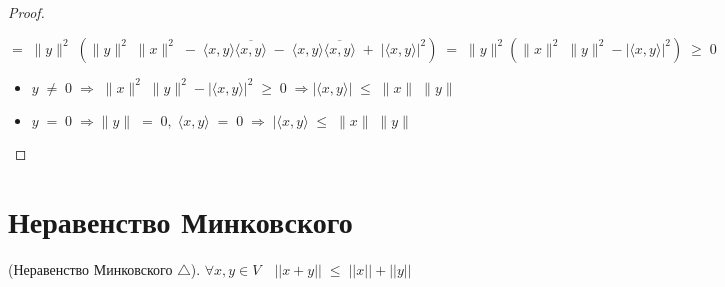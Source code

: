 \documentclass[12px]{report}
\begin{document}
\begin{proof}
\begin{enumerate}
        $$= \; \|y\|^2 \; (\|y\|^2 \; \|x\|^2 \; - \; \langle x, y \rangle \overline{\langle x, y \rangle} \; - \; \langle x,y \rangle \overline{\langle x, y \rangle} \; + \; |\langle x, y \rangle|^2) \; = \; \|y\|^2(\|x\|^2 \; \|y\|^2 - |\langle x, y \rangle|^2) \; \geq \; 0$$
        
        
        \begin{itemize}
        
        \vspace{0.4cm} \item $y \; \neq \; 0 \; \Longrightarrow \; \|x\|^2 \; \|y\|^2 - |\langle x, y \rangle|^2 \; \geq \; 0 \; \Longrightarrow |\langle x, y \rangle| \; \leq \; \|x\| \; \|y\|$
        
        \vspace{0.4cm} \item $y \; = \; 0 \; \Longrightarrow \|y\| \; = \; 0, \; \langle x, y \rangle \; = \; 0 \; \Longrightarrow \; |\langle x, y \rangle \; \leq \; \|x\| \; \|y\|$
        \end{itemize}
    \end{enumerate}
\end{proof}

\clearpage
\section{Неравенство Минковского}
\begin{shth}
    \begin{theorem}
        (Неравенство Минковского $\triangle$).
        \newline
        $\forall x,y \in V \quad ||x + y|| \; \leq \; ||x|| + ||y||$
    \end{theorem}
\end{shth}
\end{document}
